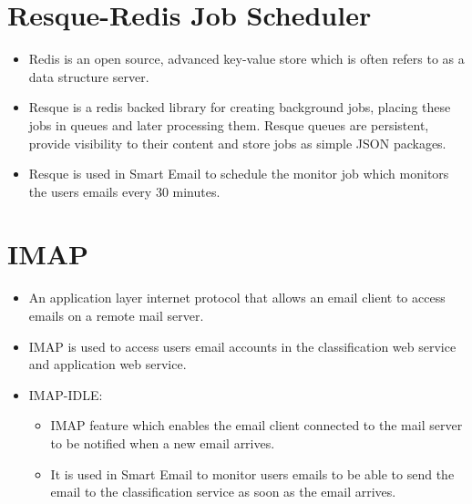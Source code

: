 \section{Resque-Redis Job Scheduler}
\begin{itemize}
 \item Redis is an open source, advanced key-value store which is often refers to as a data structure server.
 \item Resque is a redis backed library for creating background jobs, placing these jobs in queues and 
      later processing them. Resque queues are persistent, provide visibility to their content and 
      store jobs as simple JSON packages.
 \item Resque is used  in Smart Email to schedule the monitor job which monitors the users emails every 30 minutes. 
\end{itemize}

\section{IMAP}
\begin{itemize}
 \item An application layer internet protocol that allows an email client to access emails on a remote mail server.
 \item IMAP is used to access users email accounts in the classification web service and application web service.
 \item IMAP-IDLE:
 \begin{itemize}
  \item IMAP feature which enables the email client connected to the mail server to be notified when a new email arrives.
  \item It is used in Smart Email to monitor users emails to be able to send the email to the classification service as soon as the email arrives.
 \end{itemize}
\end{itemize}
